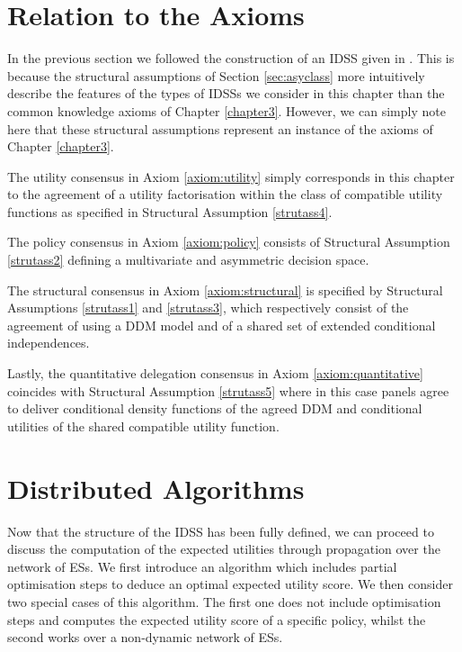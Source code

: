 \section{Relation to the Axioms}
\label{sec:relation}
In the previous section we followed the construction of an IDSS given in \citet{Leonelli2015}. This is because the structural assumptions of Section \ref{sec:asyclass} more intuitively describe the features of the types of IDSSs we consider in this chapter than the common knowledge axioms of Chapter \ref{chapter3}. However, we can simply note here that these structural assumptions represent an instance of the axioms of Chapter \ref{chapter3}.

The utility consensus in Axiom \ref{axiom:utility} simply corresponds in this chapter to the agreement of a utility factorisation within the class of compatible utility functions as specified in Structural Assumption \ref{strutass4}. 

The policy consensus in Axiom \ref{axiom:policy} consists of Structural Assumption \ref{strutass2} defining a multivariate and asymmetric decision space. 

The structural consensus in Axiom \ref{axiom:structural} is specified by Structural Assumptions \ref{strutass1} and \ref{strutass3}, which respectively consist of the agreement of using a DDM model and of a shared set of extended conditional independences.

Lastly, the quantitative delegation consensus in Axiom \ref{axiom:quantitative} coincides with Structural Assumption \ref{strutass5} where in this case panels agree to deliver conditional density functions of the agreed DDM and conditional utilities of the shared compatible utility function.
 
\section{Distributed Algorithms}
\label{sec:algorithms}
Now that the structure of the IDSS has  been fully defined,  we can proceed to discuss the computation of the expected utilities through propagation over the network of ESs.  We first introduce an algorithm which includes partial optimisation steps to deduce an optimal expected utility score. We then consider two special cases of this algorithm. The first one does not include  optimisation steps and computes the expected utility score of a specific policy, whilst the second works over a non-dynamic network of ESs.

